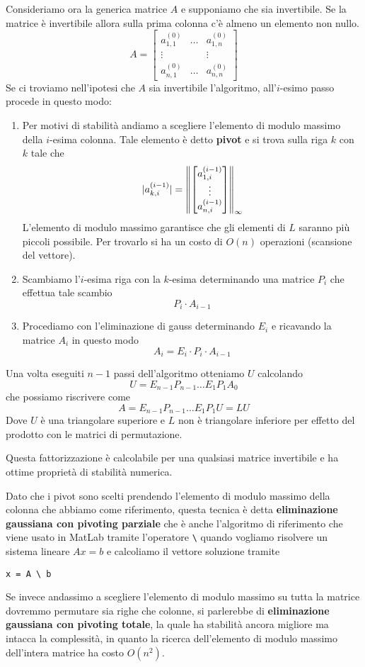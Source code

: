 Consideriamo ora la generica matrice $A$ e supponiamo che sia invertibile. Se la matrice è invertibile allora
sulla prima colonna c'è almeno un elemento non nullo.
\[
	A = \begin{bmatrix}
		a_{1,1}^{(0)} & \dots & a_{1,n}^{(0)} \\
		\vdots        &       & \vdots        \\
		a_{n,1}^{(0)} & \dots & a_{n,n}^{(0)}
	\end{bmatrix}
\]
Se ci troviamo nell'ipotesi che $A$ sia invertibile l'algoritmo, all'$i$-esimo passo procede in questo modo:
\begin{enumerate}
	\item Per motivi di stabilità andiamo a scegliere l'elemento di modulo massimo della $i$-esima colonna.
	      Tale elemento è detto \textbf{pivot} e si trova sulla riga $k$ con $k$ tale che
	      \[
		      | a_{k,i}^{(i-1)} | = \left\lVert
			      \begin{bmatrix}
				      a_{1,i}^{(i-1)} \\ \vdots \\ a_{n,i}^{(i-1)}
			      \end{bmatrix}\right\rVert_\infty
	      \]
	      L'elemento di modulo massimo garantisce che gli elementi di $L$ saranno più piccoli possibile. Per
	      trovarlo si ha un costo di $O(n)$ operazioni (scansione del vettore).
	\item Scambiamo l'$i$-esima riga con la $k$-esima determinando una matrice $P_i$ che effettua tale scambio
	      \[ P_i \cdot A_{i-1} \]
	\item Procediamo con l'eliminazione di gauss determinando $E_i$ e ricavando la matrice $A_i$ in questo modo
	      \[ A_i = E_i \cdot P_i \cdot A_{i-1} \]
\end{enumerate}
Una volta eseguiti $n-1$ passi dell'algoritmo otteniamo $U$ calcolando
\[ U = E_{n-1} P_{n-1} \dots E_1 P_1 A_0 \]
che possiamo riscrivere come
\[ A = E_{n-1} P_{n-1} \dots E_1 P_1 U = L U \]
Dove $U$ è una triangolare superiore e $L$ non è triangolare inferiore per effetto del prodotto con le matrici
di permutazione.

Questa fattorizzazione è calcolabile per una qualsiasi matrice invertibile e ha ottime proprietà di stabilità
numerica.

Dato che i pivot sono scelti prendendo l'elemento di modulo massimo della colonna che abbiamo come
riferimento, questa tecnica è detta \textbf{eliminazione gaussiana con pivoting parziale} che è anche l'algoritmo
di riferimento che viene usato in MatLab tramite l'operatore \verb|\| quando vogliamo risolvere un sistema lineare
$Ax = b$ e calcoliamo il vettore soluzione tramite
\begin{center}
	\verb|x = A \ b|
\end{center}
Se invece andassimo a scegliere l'elemento di modulo massimo su tutta la matrice dovremmo permutare sia righe
che colonne, si parlerebbe di \textbf{eliminazione gaussiana con pivoting totale}, la quale ha stabilità ancora
migliore ma intacca la complessità, in quanto la ricerca dell'elemento di modulo massimo dell'intera matrice ha
costo $O(n^2)$.

